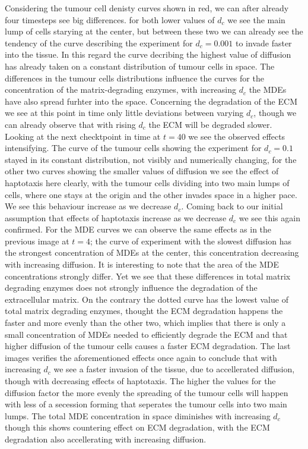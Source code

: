 Considering the tumour cell denisty curves shown in red, we can after already four timesteps see big differences. for both lower values of $d_c$ we see the main lump of cells starying at the center, but between these two we can already see the tendency of the curve describing the experiment for $d_c=0.001$ to invade faster into the tissue. In this regard the curve decribing the highest value of diffusion has already taken on a constant distribution of tumour cells in space. The differences in the tumour cells distributions influence the curves for the concentration of the matrix-degrading enzymes, with increasing $d_c$ the MDEs have also spread furhter into the space. Concerning the degradation of the ECM we see at this point in time only little deviations between varying $d_c$, though  we can already observe that with rising $d_c$ the ECM will be degraded slower. \newline
Looking at the next checktpoint in time at $t=40$ we see the observed effects intensifying. The curve of the tumour cells showing the experiment for $d_c=0.1$ stayed in its constant distribution, not visibly and numerically changing, for the other two curves showing the smaller values of diffusion we see the effect of haptotaxis here clearly, with the tumour cells dividing into two main lumps of cells, where one stays at the origin and the other invades space in a higher pace. We see this behaviour increase as we decrease $d_c$. Coming back to our initial assumption that effects of haptotaxis increase as we decrease $d_c$ we see this again confirmed. For the MDE curves we can observe the same effects as in the previous image at $t=4$; the curve of experiment with the slowest diffusion has the strongest concentration of MDEs at the center, this concentration decreasing with increasing diffusion. It is interesting to note that the area of the MDE concentrations strongly differ. Yet we see that these differences in total matrix degrading enzymes does not strongly influence the degradation of the extracellular matrix. On the contrary the dotted curve has the lowest value of total matrix degrading enzymes, thought the ECM degradation happens the faster and more evenly than the other two, which implies that there is only a small concentration of MDEs needed to efficiently degrade the ECM and that higher diffusion of the tumour cells causes a faster ECM degradation. \newline 
The last images verifies the aforementioned effects once again to conclude that with increasing $d_c$ we see a faster invasion of the tissue, due to accellerated diffusion, though with decreasing effects of haptotaxis. The higher the values for the diffusion factor the more evenly the spreading of the tumour cells will happen with less of a secession forming that seperates the tumour cells into two main lumps. The total MDE concentration in space diminishes with increasing $d_c$ though this shows countering effect on ECM degradation, with the ECM degradation also accellerating with increasing diffusion.


